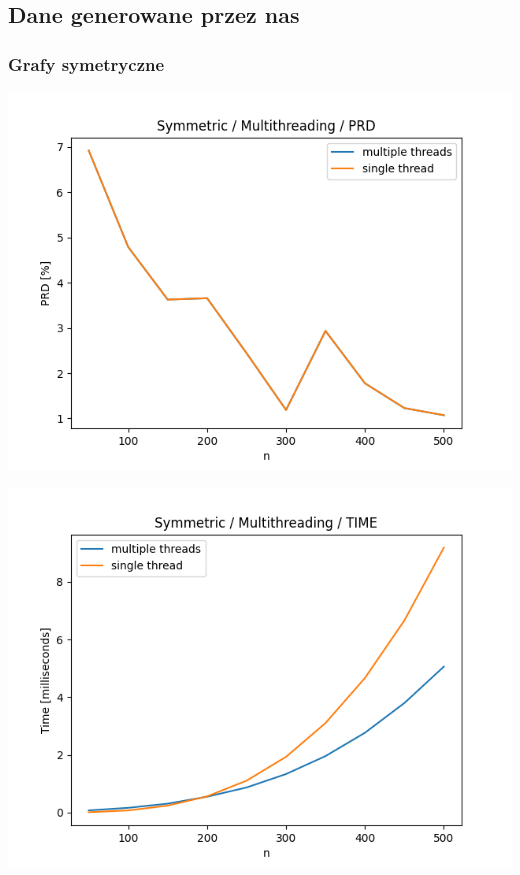 \documentclass{article}
\begin{document}
\subsection{Dane generowane przez nas}


\subsubsection{Grafy symetryczne}

\begin{center}
\includegraphics[width=\textwidth, 
                   height = 0.4\textheight, 
                   keepaspectratio]
                  {plots/multithreading_symmetric_prd} 
\end{center}

\begin{center}
\includegraphics[width=\textwidth, 
                   height = 0.4\textheight, 
                   keepaspectratio]
                  {plots/multithreading_symmetric_time} 
\end{center}
\end{document}
